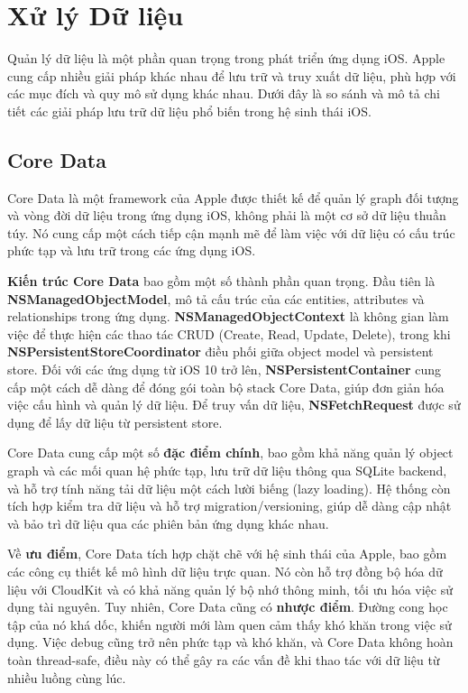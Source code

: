 \section{Xử lý Dữ liệu}

Quản lý dữ liệu là một phần quan trọng trong phát triển ứng dụng iOS. Apple cung cấp nhiều giải pháp khác nhau để lưu trữ và truy xuất dữ liệu, phù hợp với các mục đích và quy mô sử dụng khác nhau. Dưới đây là so sánh và mô tả chi tiết các giải pháp lưu trữ dữ liệu phổ biến trong hệ sinh thái iOS.


\subsection{Core Data}
Core Data \cite{Core-Data} là một framework của Apple được thiết kế để quản lý graph đối tượng và vòng đời dữ liệu trong ứng dụng iOS, không phải là một cơ sở dữ liệu thuần túy. Nó cung cấp một cách tiếp cận mạnh mẽ để làm việc với dữ liệu có cấu trúc phức tạp và lưu trữ trong các ứng dụng iOS.

\vspace{0.5em}

\textbf{Kiến trúc Core Data} bao gồm một số thành phần quan trọng. Đầu tiên là \textbf{NSManagedObjectModel}, mô tả cấu trúc của các entities, attributes và relationships trong ứng dụng. \textbf{NSManagedObjectContext} là không gian làm việc để thực hiện các thao tác CRUD (Create, Read, Update, Delete), trong khi \textbf{NSPersistentStoreCoordinator} điều phối giữa object model và persistent store. Đối với các ứng dụng từ iOS 10 trở lên, \textbf{NSPersistentContainer} cung cấp một cách dễ dàng để đóng gói toàn bộ stack Core Data, giúp đơn giản hóa việc cấu hình và quản lý dữ liệu. Để truy vấn dữ liệu, \textbf{NSFetchRequest} được sử dụng để lấy dữ liệu từ persistent store.

\vspace{0.5em}

Core Data cung cấp một số \textbf{đặc điểm chính}, bao gồm khả năng quản lý object graph và các mối quan hệ phức tạp, lưu trữ dữ liệu thông qua SQLite backend, và hỗ trợ tính năng tải dữ liệu một cách lười biếng (lazy loading). Hệ thống còn tích hợp kiểm tra dữ liệu và hỗ trợ migration/versioning, giúp dễ dàng cập nhật và bảo trì dữ liệu qua các phiên bản ứng dụng khác nhau.

\vspace{0.5em}

Về \textbf{ưu điểm}, Core Data tích hợp chặt chẽ với hệ sinh thái của Apple, bao gồm các công cụ thiết kế mô hình dữ liệu trực quan. Nó còn hỗ trợ đồng bộ hóa dữ liệu với CloudKit và có khả năng quản lý bộ nhớ thông minh, tối ưu hóa việc sử dụng tài nguyên.
Tuy nhiên, Core Data cũng có \textbf{nhược điểm}. Đường cong học tập của nó khá dốc, khiến người mới làm quen cảm thấy khó khăn trong việc sử dụng. Việc debug cũng trở nên phức tạp và khó khăn, và Core Data không hoàn toàn thread-safe, điều này có thể gây ra các vấn đề khi thao tác với dữ liệu từ nhiều luồng cùng lúc.

